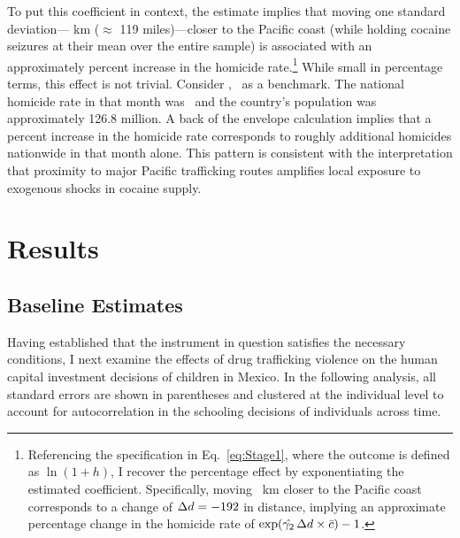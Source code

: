 \documentclass[12pt,letter,english,intoc,bibliography=totoc,index=totoc,BCOR10mm,captions=tableheading,nottitlepage,fleqn]{article}
\theoremstyle{break}
\begin{document}
To put this coefficient in context, the estimate implies that moving one standard deviation---{} km ($\approx$ 119 miles)---closer to the Pacific coast (while holding cocaine seizures at their mean over the entire sample) is associated with an approximately {} percent increase in the homicide rate.\footnote{Referencing the specification in Eq.~\eqref{eq:Stage1}, where the outcome is defined as $\ln(1+h)$, I recover the percentage effect by exponentiating the estimated coefficient. Specifically, moving {}~km closer to the Pacific coast corresponds to a change of $\Delta d = -{\fpeval{round(\DistanceSd,2)}}$ in distance, implying an approximate percentage change in the homicide rate of $\exp(\hat{\gamma_2}\,\Delta d\times\Bar{c})-1$.} While small in percentage terms, this effect is not trivial. Consider \RespikeMaxMonthName, \RespikeMaxYear\ as a benchmark. The national homicide rate in that month was \RespikeMaxHR\ and the country's population was approximately 126.8 million. A back of the envelope calculation implies that a  {} percent increase in the homicide rate corresponds to roughly {} additional homicides nationwide in that month alone. This pattern is consistent with the interpretation that proximity to major Pacific trafficking routes amplifies local exposure to exogenous shocks in cocaine supply.
\section{Results}
\subsection*{Baseline Estimates}
Having established that the instrument in question satisfies the necessary conditions, I next examine the effects of drug trafficking violence on the human capital investment decisions of children in Mexico. In the following analysis, all standard errors are shown in parentheses and clustered at the individual level to account for autocorrelation in the schooling decisions of individuals across time. 
\end{document}
